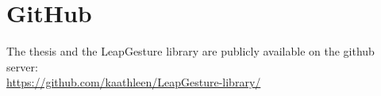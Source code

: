 
\chapter{GitHub}
The thesis and the LeapGesture library are publicly available on the github server: \\
\url{https://github.com/kaathleen/LeapGesture-library/} 
